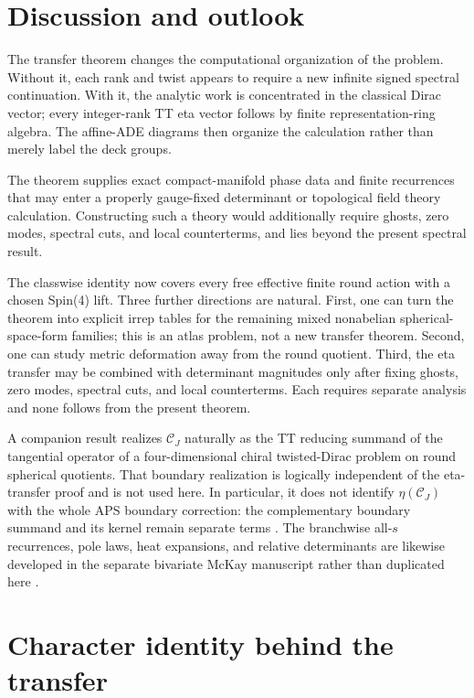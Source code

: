 \documentclass[11pt]{article}
\theoremstyle{definition}
\begin{document}
\section{Discussion and outlook}

The transfer theorem changes the computational organization of the problem.
Without it, each rank and twist appears to require a new infinite signed
spectral continuation.  With it, the analytic work is concentrated in the
classical Dirac vector; every integer-rank TT eta vector follows by finite
representation-ring algebra.  The affine-ADE diagrams then organize the
calculation rather than merely label the deck groups.

The theorem supplies exact compact-manifold phase data and finite recurrences
that may enter a properly gauge-fixed determinant or topological field theory
calculation.  Constructing such a theory would additionally require ghosts,
zero modes, spectral cuts, and local counterterms, and lies beyond the present
spectral result.

The classwise identity now covers every free effective finite round action
with a chosen Spin(4) lift.  Three further directions are natural.  First, one
can turn the theorem into explicit irrep tables for the remaining mixed
nonabelian spherical-space-form families; this is an atlas problem, not a new
transfer theorem.  Second, one can study metric deformation away from the
round quotient.  Third, the eta transfer may be combined with determinant
magnitudes only after fixing ghosts, zero modes, spectral cuts, and local
counterterms.  Each requires separate analysis and none follows from the
present theorem.

A companion result realizes $\mathcal C_J$ naturally as the TT reducing
summand of the tangential operator of a four-dimensional chiral twisted-Dirac
problem on round spherical quotients.  That boundary realization is logically
independent of the eta-transfer proof and is not used here.  In particular,
it does not identify $\eta(\mathcal C_J)$ with the whole APS boundary
correction: the complementary boundary summand and its kernel remain separate
terms \cite{MahmoodP7Collection2026}.  The branchwise all-$s$ recurrences,
pole laws, heat expansions, and relative determinants are likewise developed
in the separate bivariate McKay manuscript rather than duplicated here
\cite{MahmoodP4Collection2026}.

\appendix

\section{Character identity behind the transfer}
\end{document}
